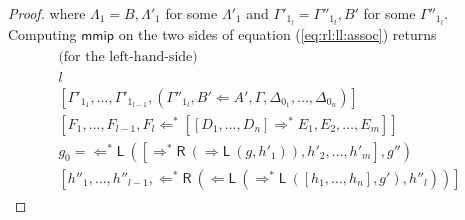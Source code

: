 \documentclass[a4paper,UKenglish,cleveref,autoref,thm-restate, anonymous]{lipics-v2021}
\newcommand{\Larr}{\Leftarrow}
\newcommand{\Ls}{\Leftarrow^*}
\newcommand{\Rarr}{\Rightarrow}
\newcommand{\Rs}{\Rightarrow^*}
\newcommand{\mf}[1]{\mathsf{#1}}
\newcommand{\GG}{\Gamma}
\newcommand{\GD}{\Delta}
\newcommand{\GL}{\Lambda}
\newcommand{\vd}{\vdash}
\newcommand{\Ll}{{\Larr}\mathsf{L}}
\newcommand{\Lsl}{{\Ls}\mathsf{L}}
\newcommand{\Lsr}{{\Ls}\mathsf{R}}
\newcommand{\Rl}{{\Rarr}\mathsf{L}}
\newcommand{\Rsl}{{\Rs}\mathsf{L}}
\newcommand{\Rsr}{{\Rs}\mathsf{R}}
\begin{document}
\begin{proof}
where $\GL_1 = B , \GL'_1$ for some $\GL'_1$ and $\GG'_{1_l} = \GG''_{1_l} , B'$ for some $\GG''_{1_l}$.
Computing $\mf{mmip}$ on the two sides of equation (\ref{eq:rl:ll:assoc}) returns
\[
\begin{array}{c}
     \begin{array}{c}
       \text{(for the left-hand-side)} \\
       l
       \\ %
         {[\GG'_{1_1}, \dots, \GG'_{1_{l-1}}, (\GG''_{1_l} , B'\Larr A',\GG,\GD_{0_1},\dots,\GD_{0_n})]}
           \\
             {[F_1,\dots,F_{l-1}, F_l \Ls [[D_1,\dots,D_n] \Rs E_1,E_2,\dots,E_m]]}
           \\
           g_0 = \Lsl \ ([\Rsr \ (\Rl \ (g, h'_1)), h'_2,\dots,h'_m], g'')
           \\
             {[h''_1, \dots, h''_{l-1}, \Lsr \ (\Ll \ (\Rsl\ ([h_1,\dots,h_n],g') , h''_l))]}

\end{array}
\end{array}\]
\end{proof}
\end{document}
